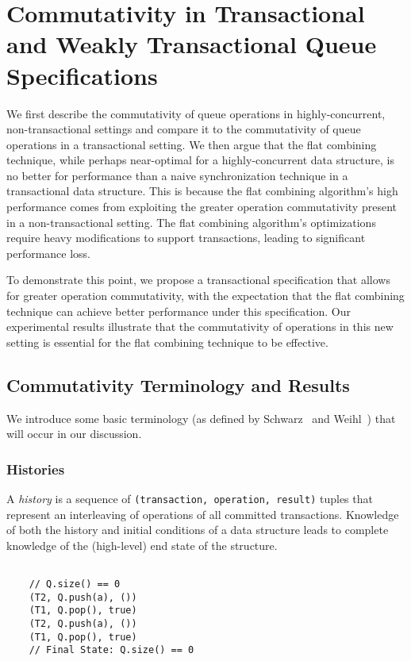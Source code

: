 \chapter{Commutativity in Transactional and Weakly Transactional Queue Specifications}
\label{commutativity}

We first describe the commutativity of queue operations in highly-concurrent, non-transactional settings and compare it to the commutativity of queue operations in a transactional setting. We then argue that the flat combining technique, while perhaps near-optimal for a highly-concurrent data structure, is no better for performance than a naive synchronization technique in a transactional data structure. This is because the flat combining algorithm's high performance comes from exploiting the greater operation commutativity present in a non-transactional setting. The flat combining algorithm's optimizations require heavy modifications to support transactions, leading to significant performance loss. 

To demonstrate this point, we propose a transactional specification that allows for greater operation commutativity, with the expectation that the flat combining technique can achieve better performance under this specification. Our experimental results illustrate that the commutativity of operations in this new setting is essential for the flat combining technique to be effective.

\section{Commutativity Terminology and Results}
We introduce some basic terminology (as defined by Schwarz~\cite{schwarz} and Weihl~\cite{weihl}) that will occur in our discussion.

\subsection{Histories}
\begin{defn}
    A \emph{history} is a sequence of \texttt{(transaction, operation, result)} tuples that represent an interleaving of operations of all committed transactions. Knowledge of both the history and initial conditions of a data structure leads to complete knowledge of the (high-level) end state of the structure.

\begin{eg}
    \singlespacing   

    \begin{lstlisting}

    // Q.size() == 0 
    (T2, Q.push(a), ())
    (T1, Q.pop(), true)
    (T2, Q.push(a), ())
    (T1, Q.pop(), true)
    // Final State: Q.size() == 0 
    \end{lstlisting}
    \doublespacing
\end{eg}

\end{defn}

